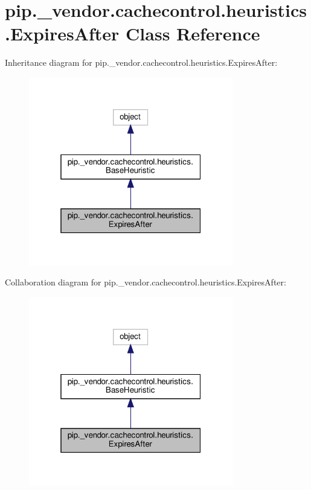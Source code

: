 \hypertarget{classpip_1_1__vendor_1_1cachecontrol_1_1heuristics_1_1ExpiresAfter}{}\section{pip.\+\_\+vendor.\+cachecontrol.\+heuristics.\+Expires\+After Class Reference}
\label{classpip_1_1__vendor_1_1cachecontrol_1_1heuristics_1_1ExpiresAfter}


Inheritance diagram for pip.\+\_\+vendor.\+cachecontrol.\+heuristics.\+Expires\+After\+:
\nopagebreak
\begin{figure}[H]
\begin{center}
\leavevmode
\includegraphics[width=253pt]{classpip_1_1__vendor_1_1cachecontrol_1_1heuristics_1_1ExpiresAfter__inherit__graph}
\end{center}
\end{figure}


Collaboration diagram for pip.\+\_\+vendor.\+cachecontrol.\+heuristics.\+Expires\+After\+:
\nopagebreak
\begin{figure}[H]
\begin{center}
\leavevmode
\includegraphics[width=253pt]{classpip_1_1__vendor_1_1cachecontrol_1_1heuristics_1_1ExpiresAfter__coll__graph}
\end{center}
\end{figure}

